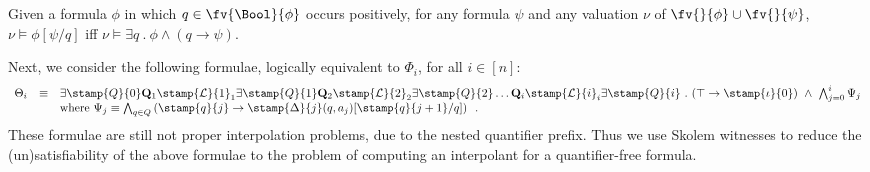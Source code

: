 \begin{proposition}\label{prop:substitution}
  Given a formula $\phi$ in which $q \in \fv{\Bool}{\phi}$ occurs
  positively, for any formula $\psi$ and any valuation $\nu$ of
  $\fv{}{\phi} \cup \fv{}{\psi}$, \(\nu \models \phi[\psi/q]\) iff
  \(\nu \models \exists q ~.~ \phi \wedge (q \rightarrow \psi)\).
\end{proposition}
Next, we consider the following formulae, logically equivalent to
$\Phi_i$, for all $i \in [n]$:
\[\begin{array}{rcl} 
\Theta_i & \equiv & \mathbf{\exists} \stamp{Q}{0} \mathbf{Q}_1
\stamp{\mathcal{L}}{1}_1 \mathbf{\exists} \stamp{Q}{1} \mathbf{Q}_2
\stamp{\mathcal{L}}{2}_2 \mathbf{\exists} \stamp{Q}{2} \ldots
\mathbf{Q}_i \stamp{\mathcal{L}}{i}_i \mathbf{\exists} \stamp{Q}{i} 
~.~ (\top \rightarrow \stamp{\iota}{0}) ~\wedge~ \bigwedge_{j=0}^i \Psi_j \\
&& \text{where } \Psi_j \equiv \bigwedge_{q \in Q} \left(\stamp{q}{j} \rightarrow
\stamp{\Delta}{j}(q,a_j)[\stamp{q}{j+1}/q]\right)\enspace.
\end{array}\] These formulae are
still not proper interpolation problems, due to the nested quantifier
prefix. Thus we use Skolem witnesses to reduce the (un)satisfiability
of the above formulae to the problem of computing an interpolant for a
quantifier-free formula.

